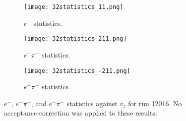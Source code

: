     \begin{figure}
        \centering
        \begin{subfigure}[b]{\textwidth}
            \centering
            \texttt{[image: 32statistics\_11.png]}
            \caption{$e^-$ statistics.}
            \label{fig::14.32::statistics_11}
        \end{subfigure}
        \centering
        \begin{subfigure}[b]{0.49\textwidth}
            \centering
            \texttt{[image: 32statistics\_211.png]}
            \caption{$e^-\pi^+$ statistics.}
            \label{fig::14.32::statistics_211}
        \end{subfigure}
        \hfill
        \begin{subfigure}[b]{0.49\textwidth}
            \centering
            \texttt{[image: 32statistics\_-211.png]}
            \caption{$e^-\pi^-$ statistics.}
            \label{fig::14.32::statistics_-211}
        \end{subfigure}
        \caption[Statistics for $e^-$, $e^-\pi^+$, and $e^-\pi^-$ against $v_z$]
        {$e^-$, $e^-\pi^+$, and $e^-\pi^-$ statistics against $v_z$ for run 12016.
        No acceptance correction was applied to these results.}
        \label{fig::14.32::statistics}
    \end{figure}
